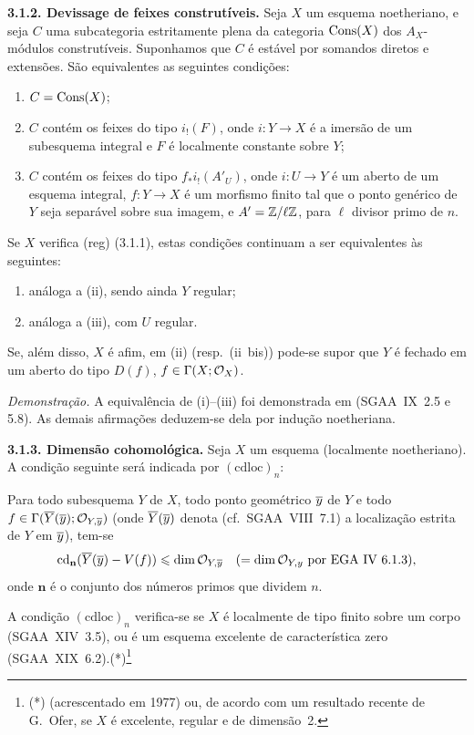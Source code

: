 \textbf{3.1.2. Devissage de feixes construtíveis.} Seja $X$ um esquema noetheriano, e seja $C$ uma subcategoria estritamente plena da categoria $\operatorname{Cons}(X)$ dos $A_X$-módulos construtíveis. Suponhamos que $C$ é estável por somandos diretos e extensões. São equivalentes as seguintes condições:
\begin{enumerate}
\item[(i)] $C = \operatorname{Cons}(X)$;
\item[(ii)] $C$ contém os feixes do tipo $i_{!}(F)$, onde $i : Y \to X$ é a imersão de um subesquema integral e $F$ é localmente constante sobre $Y$;
\item[(iii)] $C$ contém os feixes do tipo $f_{*}i_{!}(A'_U)$, onde $i : U \to Y$ é um aberto de um esquema integral, $f : Y \to X$ é um morfismo finito tal que o ponto genérico de $Y$ seja separável sobre sua imagem, e $A' = \mathbb{Z}/\ell\mathbb{Z}$, para $\ell$ divisor primo de $n$.
\end{enumerate}
Se $X$ verifica (reg) (3.1.1), estas condições continuam a ser equivalentes às seguintes:
\begin{enumerate}
\item[(ii~bis)] análoga a (ii), sendo ainda $Y$ regular;
\item[(iii~bis)] análoga a (iii), com $U$ regular.
\end{enumerate}
Se, além disso, $X$ é afim, em (ii) (resp.~(ii~bis)) pode-se supor que $Y$ é fechado em um aberto do tipo $D(f)$, $f \in \Gamma(X; \mathcal{O}_X)$.

\emph{Demonstração.} A equivalência de (i)--(iii) foi demonstrada em (SGAA~IX~2.5 e 5.8). As demais afirmações deduzem-se dela por indução noetheriana.

\textbf{3.1.3. Dimensão cohomológica.} Seja $X$ um esquema (localmente noetheriano). A condição seguinte será indicada por $(\mathrm{cdloc})_n$:

Para todo subesquema $Y$ de $X$, todo ponto geométrico $\overline{y}$ de $Y$ e todo $f \in \Gamma(\overline{Y}(\overline{y}); \mathcal{O}_{Y,\overline{y}})$ (onde $\overline{Y}(\overline{y})$ denota (cf.~SGAA~VIII~7.1) a localização estrita de $Y$ em $\overline{y}$), tem-se
\[
\operatorname{cd}_{\mathbf{n}}(\overline{Y}(\overline{y}) - V(f)) \leqslant \dim \mathcal{O}_{Y,\overline{y}} \quad (= \dim \mathcal{O}_{Y,y} \text{ por EGA~IV~6.1.3}),
\]
onde $\mathbf{n}$ é o conjunto dos números primos que dividem $n$.

A condição $(\mathrm{cdloc})_n$ verifica-se se $X$ é localmente de tipo finito sobre um corpo (SGAA~XIV~3.5), ou é um esquema excelente de característica zero (SGAA~XIX~6.2).(*)\footnote{(*) (acrescentado em 1977) ou, de acordo com um resultado recente de G.~Ofer, se $X$ é excelente, regular e de dimensão~2.}

